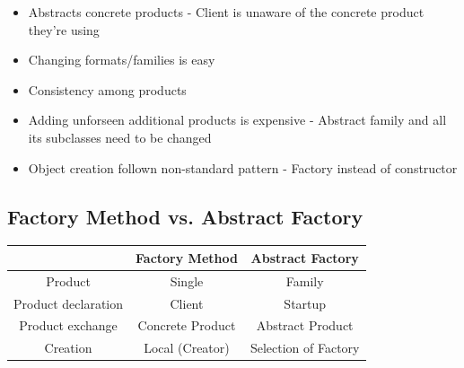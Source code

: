 \documentclass[
    ../../Software_Engineering_Summary.tex,
]
{subfiles}
\begin{document}
\begin{defbox}
    \begin{itemize}
        \item Abstracts concrete products - Client is unaware of the concrete product they're using
        \item Changing formats/families is easy
        \item Consistency among products
    \end{itemize}
\end{defbox}

\begin{defbox}
    \begin{itemize}
        \item Adding unforseen additional products is expensive - Abstract family and all its subclasses need to be changed
        \item Object creation follown non-standard pattern - Factory instead of constructor
    \end{itemize}
\end{defbox}

\subsection{Factory Method vs. Abstract Factory}

\begin{defbox*}

    \begin{center}
	\begin{tabular}{|c|c c|}
        \hline
        & Factory Method & Abstract Factory\\
        \hline
        \hline
        Product & Single & Family\\
        \hline
        Product declaration & Client & Startup\\
        \hline
        Product exchange & Concrete Product & Abstract Product\\
        \hline 
        Creation & Local (Creator) & Selection of Factory\\
        \hline
    \end{tabular}
    \end{center}
\end{defbox*}
\end{document}

